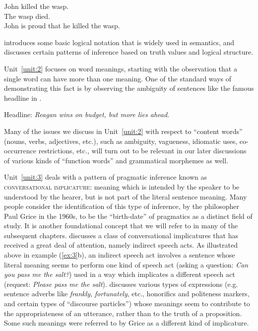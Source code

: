 \ea \label{ex:4}
\ea John killed the wasp.\\
\ex The wasp died.\\
\ex John is proud that he killed the wasp.
                       \z
\z


 introduces some basic logical notation that is widely used in semantics, and discusses certain patterns of inference based on truth values and logical structure.



Unit~\ref{unit:2} focuses on word meanings, starting with the observation that a single word can have more than one meaning. One of the standard ways of demonstrating this fact is by observing the ambiguity of sentences like the famous headline in .


\ea \label{ex:5}
Headline: \textit{Reagan wins on budget, but more lies ahead}.
\z


Many of the issues we discuss in Unit~\ref{unit:2} with respect to “content words” (nouns, verbs, adjectives, etc.), such as ambiguity, vagueness, idiomatic uses, co-occurrence restrictions, etc., will turn out to be relevant in our later discussions of various kinds of “function words” and grammatical morphemes as well.


Unit~\ref{unit:3} deals with a pattern of pragmatic inference known as \textsc{conversational implicature}: meaning which is intended by the speaker to be understood by the hearer, but is not part of the literal sentence meaning. Many people consider the identification of this type of inference, by the philosopher Paul Grice in the 1960s, to be the “birth-date” of pragmatics as a distinct field of study. It is another foundational concept that we will refer to in many of the subsequent chapters.  discusses a class of conversational implicatures that has received a great deal of attention, namely indirect speech acts. As illustrated above in example (\ref{ex:3}b), an indirect speech act involves a sentence whose literal meaning seems to perform one kind of speech act (asking a question: \textit{Can you pass me the salt?}) used in a way which implicates a different speech act (request: \textit{Please pass me the salt}).  discusses various types of expressions (e.g. sentence adverbs like \textit{frankly}, \textit{fortunately}, etc., honorifics and politeness markers, and certain types of “discourse particles”) whose meanings seem to contribute to the appropriateness of an utterance, rather than to the truth of a proposition. Some such meanings were referred to by Grice as a different kind of implicature.



